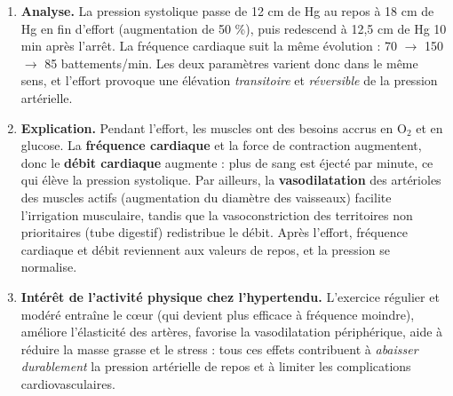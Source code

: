 \documentclass[11pt]{article}
\begin{document}
\begin{corrige}
\begin{enumerate}
\item \textbf{Analyse.} La pression systolique passe de 12 cm de Hg au repos à 18 cm de Hg en fin d'effort (augmentation de 50 \%), puis redescend à 12,5 cm de Hg 10 min après l'arrêt. La fréquence cardiaque suit la même évolution : 70 $\to$ 150 $\to$ 85 battements/min. Les deux paramètres varient donc dans le même sens, et l'effort provoque une élévation \emph{transitoire} et \emph{réversible} de la pression artérielle.
\item \textbf{Explication.} Pendant l'effort, les muscles ont des besoins accrus en O$_2$ et en glucose. La \textbf{fréquence cardiaque} et la force de contraction augmentent, donc le \textbf{débit cardiaque} augmente : plus de sang est éjecté par minute, ce qui élève la pression systolique. Par ailleurs, la \textbf{vasodilatation} des artérioles des muscles actifs (augmentation du diamètre des vaisseaux) facilite l'irrigation musculaire, tandis que la vasoconstriction des territoires non prioritaires (tube digestif) redistribue le débit. Après l'effort, fréquence cardiaque et débit reviennent aux valeurs de repos, et la pression se normalise.
\item \textbf{Intérêt de l'activité physique chez l'hypertendu.} L'exercice régulier et modéré entraîne le cœur (qui devient plus efficace à fréquence moindre), améliore l'élasticité des artères, favorise la vasodilatation périphérique, aide à réduire la masse grasse et le stress : tous ces effets contribuent à \emph{abaisser durablement} la pression artérielle de repos et à limiter les complications cardiovasculaires.
\end{enumerate}
\end{corrige}
\end{document}
